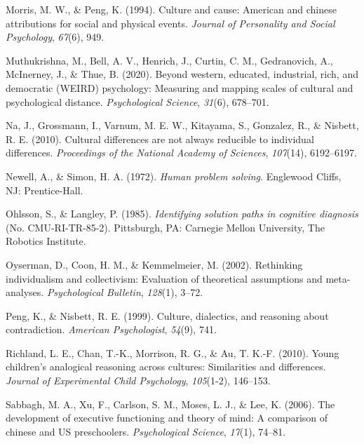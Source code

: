 \documentclass[10pt, letterpaper]{article}
\newenvironment{CSLReferences}%
  {}%
  {\par}
\begin{document}
\begin{CSLReferences}{1}{0}
\leavevmode{}%
Morris, M. W., \& Peng, K. (1994). Culture and cause: American and
chinese attributions for social and physical events. \emph{Journal of
Personality and Social Psychology}, \emph{67}(6), 949.

\leavevmode{}%
Muthukrishna, M., Bell, A. V., Henrich, J., Curtin, C. M., Gedranovich,
A., McInerney, J., \& Thue, B. (2020). Beyond western, educated,
industrial, rich, and democratic (WEIRD) psychology: Measuring and
mapping scales of cultural and psychological distance.
\emph{Psychological Science}, \emph{31}(6), 678--701.

\leavevmode{}%
Na, J., Grossmann, I., Varnum, M. E. W., Kitayama, S., Gonzalez, R., \&
Nisbett, R. E. (2010). Cultural differences are not always reducible to
individual differences. \emph{Proceedings of the National Academy of
Sciences}, \emph{107}(14), 6192--6197.

\leavevmode{}%
Newell, A., \& Simon, H. A. (1972). \emph{Human problem solving}.
Englewood Cliffs, NJ: Prentice-Hall.

\leavevmode{}%
Ohlsson, S., \& Langley, P. (1985). \emph{Identifying solution paths in
cognitive diagnosis} (No. CMU-RI-TR-85-2). Pittsburgh, PA: Carnegie
Mellon University, The Robotics Institute.

\leavevmode{}%
Oyserman, D., Coon, H. M., \& Kemmelmeier, M. (2002). Rethinking
individualism and collectivism: Evaluation of theoretical assumptions
and meta-analyses. \emph{Psychological Bulletin}, \emph{128}(1), 3--72.

\leavevmode{}%
Peng, K., \& Nisbett, R. E. (1999). Culture, dialectics, and reasoning
about contradiction. \emph{American Psychologist}, \emph{54}(9), 741.

\leavevmode{}%
Richland, L. E., Chan, T.-K., Morrison, R. G., \& Au, T. K.-F. (2010).
Young children's analogical reasoning across cultures: Similarities and
differences. \emph{Journal of Experimental Child Psychology},
\emph{105}(1-2), 146--153.

\leavevmode{}%
Sabbagh, M. A., Xu, F., Carlson, S. M., Moses, L. J., \& Lee, K. (2006).
The development of executive functioning and theory of mind: A
comparison of chinese and US preschoolers. \emph{Psychological Science},
\emph{17}(1), 74--81.


\end{CSLReferences}
\end{document}
